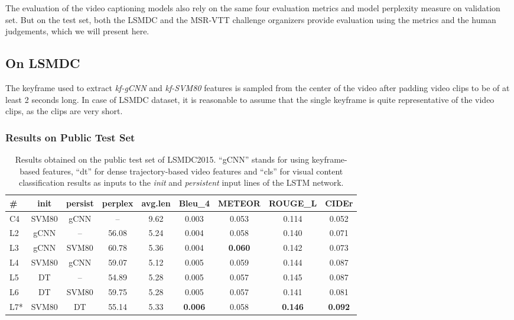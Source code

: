The evaluation of the video captioning models also rely on the same four
evaluation metrics and model perplexity measure on validation set. 
But on the test set, both the LSMDC and the MSR-VTT challenge organizers provide
evaluation using the metrics and the human judgements, which we will present
here.

\subsection{On LSMDC}
The keyframe used to extract \emph{kf-gCNN} and \emph{kf-SVM80} features is
sampled from the center of the video after padding video clips to be of at least
2 seconds long.
In case of LSMDC dataset, it is reasonable to assume that the single keyframe is
quite representative of the video clips, as the clips are very short.

\subsubsection{Results on Public Test Set}
\begin{table}[t]
  \newcommand{\modpar}[4]{%
    \multirow{2}{*}{\emph{#1}} & \multirow{2}{*}{#2} & \multirow{2}{*}{#3}
    & \multirow{2}{*}{#4}}
  \newcommand{\bs}{\bf \small}
  \centering
  \begin{adjustbox}{center}
    \begin{tabular}{|l|c|c|c|c|c|c|c|c|}
        \hline\hline
        \bs \#   &\bs init &\bs persist &\bs perplex&\bs avg.len &\bs Bleu\_4&\bs METEOR &\bs ROUGE\_L &\bs CIDEr  \\\hline\hline
        C4   & SVM80 & gCNN  &  --   & 9.62  & 0.003   &   0.053 &   0.114&   0.052 \\\hline
        L2   & gCNN  & --    & 56.08 & 5.24  & 0.004   &   0.058 &   0.140&   0.071 \\
        L3   & gCNN  & SVM80 & 60.78 & 5.36  & 0.004   &\bf0.060 &   0.142&   0.073 \\
        L4   & SVM80 & gCNN  & 59.07 & 5.12  & 0.005   &   0.059 &   0.144&   0.087 \\\hline
        L5   & DT    & --    & 54.89 & 5.28  & 0.005   &   0.057 &   0.145&   0.087 \\
        L6   & DT    & SVM80 & 59.75 & 5.28  & 0.005   &   0.057 &   0.141&   0.081 \\
        L7*  & SVM80 & DT    & 55.14 & 5.33  &\bf0.006 &   0.058 &\bf0.146&\bf0.092 \\\hline
    \end{tabular}
  \end{adjustbox}
    \caption{Results obtained on the public test set of LSMDC2015. 
      ``gCNN'' stands for using keyframe-based features, ``dt'' for
      dense trajectory-based video features and ``cls'' for visual 
      content classification results as inputs to the \emph{init}
      and \emph{persistent} input lines of the LSTM network.
      }
    \label{tab:resLsmdcVal}
\end{table}

